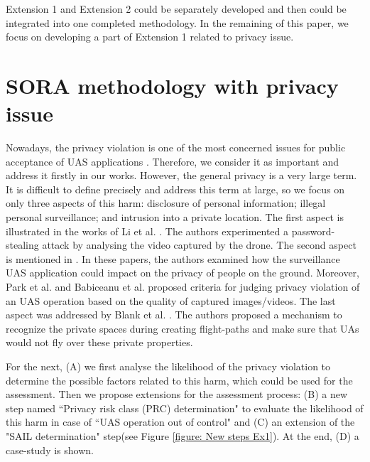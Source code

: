 \documentclass[a4paper, 10, conference]{ieeeconf}  %
\begin{document}
Extension 1 and Extension 2 could be separately developed and then could be integrated into one completed methodology. In the remaining of this paper, we focus on developing a part of Extension 1 related to privacy issue. 

\section{SORA methodology with privacy issue} \label{sec:newharm}

Nowadays, the privacy violation is one of the most concerned issues for public acceptance of UAS applications \cite{SORAV1, 7383633, Zhi2019}. Therefore, we consider it as important and address it firstly in our works. However, the general privacy is a very large term. It is difficult to define precisely \cite{Finn2013} and address this term at large, so we focus on only three aspects of this harm: disclosure of personal information; illegal personal surveillance; and intrusion into a private location. The first aspect is illustrated in the works of Li et al. \cite{8685611}. The authors experimented a password-stealing attack by analysing the video captured by the drone.  The second aspect is mentioned in \cite{Johnvilla_privacy, 7883702, 7285023}. In these papers, the authors examined how the surveillance UAS application could impact on the privacy of people on the ground. Moreover, Park et al. \cite{7883702} and Babiceanu et al. \cite{7121232} proposed criteria for judging privacy violation of an UAS operation based on the quality of captured images/videos. The last aspect was addressed by Blank et al. \cite{8328983}. The authors proposed a mechanism to recognize the private spaces during creating flight-paths and make sure that UAs would not fly over these private properties.

For the next, (A) we first analyse the likelihood of the privacy violation to determine the possible factors related to this harm, which could be used for the assessment. Then we propose extensions for the assessment process: (B) a new step named ``Privacy risk class (PRC) determination" to evaluate the likelihood of this harm in case of ``UAS operation out of control" and (C) an extension of the "SAIL determination" step(see Figure \ref{figure: New steps Ex1}). At the end, (D) a case-study is shown. 
\end{document}
